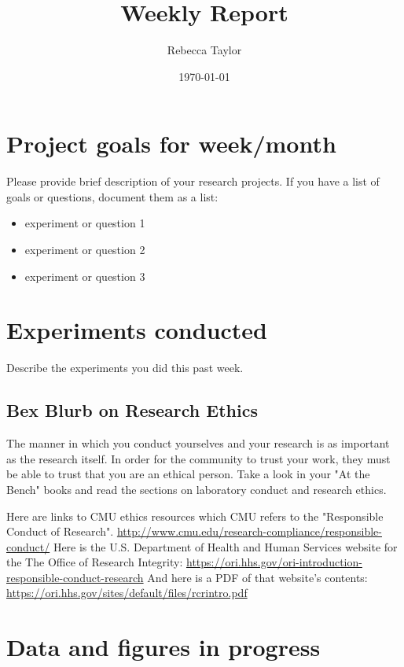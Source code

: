 \documentclass[11pt]{article}
\author{Rebecca Taylor}
\date{\today}
\title{Weekly Report}
\begin{document}
\maketitle{}

\section{Project goals for week/month}
\label{sec:orga7c2e54}

Please provide brief description of your research projects. If you have a list of goals or questions, document them as a list:
\begin{itemize}
\item experiment or question 1
\item experiment or question 2
\item experiment or question 3
\end{itemize}

\section{Experiments conducted}
\label{sec:org1664e6f}

Describe the experiments you did this past week.

\subsection{Bex Blurb on Research Ethics}
\label{sec:org1d7926e}
The manner in which you conduct yourselves and your research is as important as the research itself. In order for the community to trust your work, they must be able to trust that you are an ethical person. Take a look in your "At the Bench" books and read the sections on laboratory conduct and research ethics.

Here are links to CMU ethics resources which CMU refers to the "Responsible Conduct of Research". \url{http://www.cmu.edu/research-compliance/responsible-conduct/}
Here is the U.S. Department of Health and Human Services website for the The Office of Research Integrity: \url{https://ori.hhs.gov/ori-introduction-responsible-conduct-research}
And here is a PDF of that website's contents: \url{https://ori.hhs.gov/sites/default/files/rcrintro.pdf}

\section{Data and figures in progress}
\label{sec:orgf559ff0}
\end{document}
